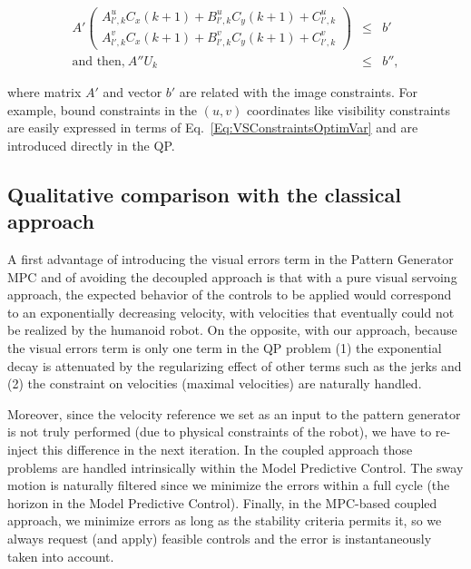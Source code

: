 \begin{eqnarray}
  A'
 \left(
 \begin{matrix}
  A^u_{l',k} C_x(k+1) +  B^u_{l',k} C_y(k+1) +  C^u_{l',k} \\
  A^v_{l',k} C_x(k+1) +  B^v_{l',k} C_y(k+1) +  C^v_{l',k}
 \end{matrix}
 \right) &\leq&  b'
 \label{Eq:VSConstraintsOptimVar}\\
\nonumber
\text{and then,} ~  A'' U_k &\leq&  b'',
\end{eqnarray}

where matrix $ A'$ and vector $ b'$ are related with the image constraints. For example, bound constraints in the $(u,v)$ coordinates like visibility constraints are easily expressed in terms of Eq.~\ref{Eq:VSConstraintsOptimVar} and are introduced directly in the QP.


\subsection{Qualitative comparison with the classical approach}

\label{subsection:qualdiscussion}

A first advantage of introducing the visual errors term in the Pattern Generator MPC and of avoiding the decoupled approach is that with a pure visual servoing approach, the expected behavior of the controls to be applied would correspond to an exponentially decreasing velocity, with velocities that eventually could not be realized by the humanoid robot. On the opposite, with our approach, because the visual errors term is only one term in the QP problem (1) the exponential decay is attenuated by the regularizing effect of other terms such as the jerks and (2) the constraint on velocities (maximal velocities) are naturally handled.   

Moreover, since the velocity reference we set as an input to the pattern generator is not truly performed (due to physical constraints of the robot), we have to re-inject this difference in the next iteration. In the coupled approach those problems are handled intrinsically within the Model Predictive Control. The sway motion is naturally filtered since we minimize the errors within a full cycle (the horizon in the Model Predictive Control). Finally, in the MPC-based coupled approach, we minimize errors as long as the stability criteria permits it, so we always request (and apply) feasible controls and the error is instantaneously taken into account.

